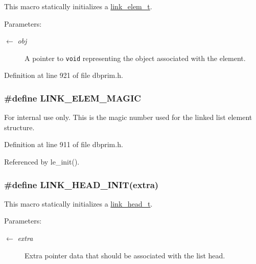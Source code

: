 This macro statically initializes a \hyperlink{group__dbprim__link_ga1}{link\_\-elem\_\-t}.

\begin{Desc}
\item[Parameters:]
\begin{description}
\item[\mbox{$\leftarrow$} {\em obj}]A pointer to {\tt void} representing the object associated with the element.\end{description}
\end{Desc}


Definition at line 921 of file dbprim.h.\hypertarget{group__dbprim__link_ga20}{
\subsubsection[LINK\_\-ELEM\_\-MAGIC]{\setlength{\rightskip}{0pt plus 5cm}\#define LINK\_\-ELEM\_\-MAGIC}}
\label{group__dbprim__link_ga20}


\begin{Desc}
\item[For internal use only.]
This is the magic number used for the linked list element structure.\end{Desc}


Definition at line 911 of file dbprim.h.

Referenced by le\_\-init().\hypertarget{group__dbprim__link_ga14}{
\subsubsection[LINK\_\-HEAD\_\-INIT]{\setlength{\rightskip}{0pt plus 5cm}\#define LINK\_\-HEAD\_\-INIT(extra)}}
\label{group__dbprim__link_ga14}


This macro statically initializes a \hyperlink{group__dbprim__link_ga0}{link\_\-head\_\-t}.

\begin{Desc}
\item[Parameters:]
\begin{description}
\item[\mbox{$\leftarrow$} {\em extra}]Extra pointer data that should be associated with the list head.\end{description}
\end{Desc}


